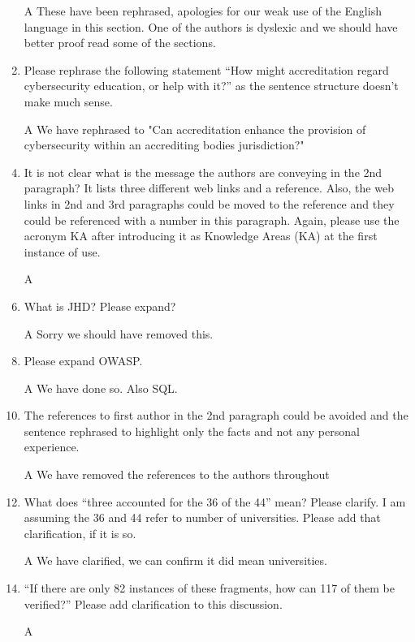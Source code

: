 \documentclass{article}
\begin{document}
\begin{enumerate}
\item[A] These have been rephrased, apologies for our weak use of the English language in this section. One of the authors is dyslexic and we should have better proof read some of the sections.
\item Please rephrase the following statement ``How might accreditation regard cybersecurity education, or help with it?'' as the sentence structure doesn't make much sense. 
\item[A] We have rephrased to "Can accreditation enhance the provision of cybersecurity within an accrediting bodies jurisdiction?"
\item It is not clear what is the message the authors are conveying in the 2nd paragraph? It lists three different web links and a reference. Also, the web links in 2nd and 3rd paragraphs could be moved to the reference and they could be referenced with a number in this paragraph. 
Again, please use the acronym KA after introducing it as Knowledge Areas (KA) at the first instance of use. 


\item[A]
\item  What is JHD? Please expand?
\item[A] Sorry we should have removed this. 
\item Please expand OWASP. 
\item[A]We have done so. Also SQL.
\item 
The references to first author in the 2nd paragraph could be avoided and the sentence rephrased to highlight only the facts and not any personal experience. 
\item[A] We have removed the references to the authors throughout
\item 
 What does ``three accounted for the 36 of the 44'' mean? Please clarify. I am assuming the 36 and 44 refer to number of universities. Please add that clarification, if it is so.
\item[A] We have clarified, we can confirm it did mean universities.
\item 
``If there are only 82 instances of these fragments, how can 117 of them be verified?'' Please add clarification to this discussion.
\item[A]
\end{enumerate}
\end{document}
